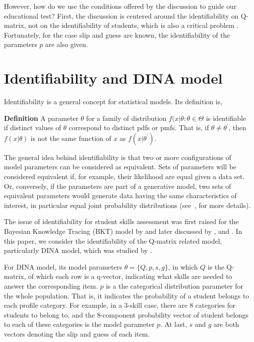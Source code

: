 \documentclass{edm_template}
\begin{document}
However, how do we use the conditions offered by the discussion to guide our educational test? First, the discussion is centered around the identifiability on Q-matrix, not on the identifiability of students, which is also a critical problem \cite{beck2007identifiability}. Fortunately, for the case slip and guess are known, the identifiability of the parameters $p$ are also given\cite{chen2015statistical}.  

\section{Identifiability and DINA model}
Identifiability is a general concept for statistical models. Its definition is,

\textbf{Definition} \cite{casella2002statistical} A parameter $\theta$ for a family of distribution ${f(x|\theta: \theta \in \Theta}$ is identifiable if distinct values of $\theta$ correspond to distinct pdfs or pmfs. That is, if $\theta \neq \theta^{\prime}$, then $f(x|\theta)$ is not the same function of $x$ as $f(x|\theta^{\prime})$.
 
The general idea behind identifiability is that two or more configurations of model parameters can be considered as equivalent.  Sets of parameters will be considered equivalent if, for example, their likelihood are equal given a data set.  Or, conversely, if the parameters are part of a generative model, two sets of equivalent parameters would generate data having the same characteristics of interest, in particular equal joint probability distributions (see~, for more details).

The issue of identifiability for student skills assessment was first raised for the Bayesian Knowledge Tracing (BKT) model by  and later discussed by , and .  In this paper, we consider the identifiability of the Q-matrix related model, particularly DINA model, which was studied by  .  

For DINA model, its model parameters $\theta = \{Q, p, s, g\}$, in which $Q$ is the Q-matrix, of which each row is a q-vector, indicating what skills are needed to answer the corresponding item. $p$ is a the categorical distribution parameter for the whole population. That is, it indicates the probability of a student belongs to each profile category. For example, in a 3-skill case, there are 8 categories for students to belong to, and the 8-component probability vector of student belongs to each of these categories is the model parameter $p$. At last, $s$ and $g$ are both vectors denoting the slip and guess of each item. 
\end{document}

